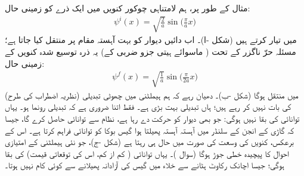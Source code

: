 مثال کے طور پر، ہم لامتناہی چوکور کنویں میں ایک ذرے کو زمینی حال:
\begin{align}
\psi^i (x) = \sqrt{\frac{2}{a}} \sin \big ( \frac{\pi}{a} x \big )
\end{align}
 میں تیار کرتے ہیں (شکل -ا)۔ اب دائیں دیوار کو بہت آہستہ مقام  پر منتقل کیا جاتا ہے؛ مسئلہ حرّ ناگزر کے تحت ( ماسوائے ہیتی جزو ضربی کے) یہ ذرہ توسیع شدہ کنویں کے زمینی حال:
\begin{align}
\psi^f (x) = \sqrt{\frac{1}{a}} \sin \big ( \frac{\pi}{2a} x \big )
\end{align}
 میں منتقل ہوگا (شکل -ب)۔ دھیان رہے کہ ہم ہیملٹنی میں چھوٹی تبدیلی (نظریہ اضطراب کی طرح) کی بات نہیں کر رہے ہیں؛ ہاں تبدیلی بہت بڑی ہے۔ فقط اتنا ضروری ہے کہ تبدیلی  رونما ہو۔ یہاں توانائی کی بقا نہیں ہوگی: جو بھی دیوار کو حرکت دے رہا ہے، نظام سے توانائی حاصل کرے گا، جیسا کہ گاڑی کے انجن کے سلنڈر میں آہستہ آہستہ پھیلتا ہوا گیس بوکا کو توانائی فراہم کرتا ہے۔ اس کے برعکس، کنویں کی  وسعت کی صورت میں حال  ہی رہتا ہے (شکل -ج)، جو نئی ہیملٹنی کے امتیازی احوال کا پیچیدہ خطی جوڑ ہوگا (سوال )۔ یہاں توانائی ( کم از کم، اس کی توقعاتی قیمت) کی بقا ہوگی؛ جیسا اچانک رکاوٹ ہٹانے سے خلاء میں گیس کی آزادانہ پھیلانے سے کوئی کام نہیں ہوتا۔


